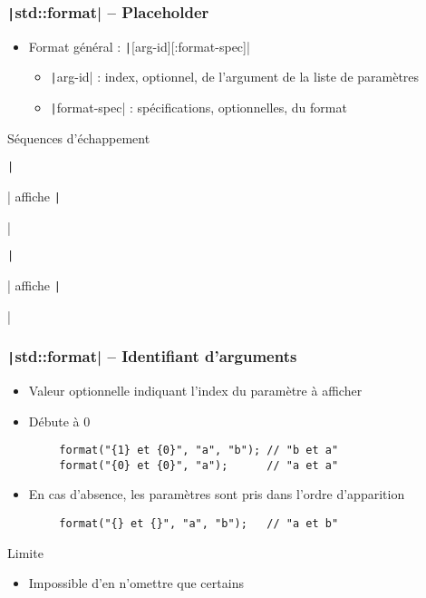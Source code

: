 \documentclass[C++.tex]{subfiles}
\begin{document}
\begin{frame}[fragile]
	\frametitle{\texttt|std::format| -- Placeholder}
	\begin{itemize}
		\item Format général : \texttt|{[arg-id][:format-spec]}|
		\begin{itemize}
			\item \texttt|arg-id| : index, optionnel, de l'argument de la liste de paramètres
			\item \texttt|format-spec| : spécifications, optionnelles, du format
		\end{itemize}
	\end{itemize}

	\begin{block}{Séquences d'échappement}
		\begin{itemize}
			\item \texttt|{{| affiche \texttt|{|
			\item \texttt|}}| affiche \texttt|}|
		\end{itemize}
	\end{block}
\end{frame}

\begin{frame}[fragile]
	\frametitle{\texttt|std::format| -- Identifiant d'arguments}
	\begin{itemize}
		\item Valeur optionnelle indiquant l'index du paramètre à afficher
		\item Débute à 0
	\end{itemize}

	\begin{verbatim}
		format("{1} et {0}", "a", "b"); // "b et a"
		format("{0} et {0}", "a");      // "a et a"
	\end{verbatim}

	\begin{itemize}
		\item En cas d'absence, les paramètres sont pris dans l'ordre d'apparition
	\end{itemize}

	\begin{verbatim}
		format("{} et {}", "a", "b");   // "a et b"
	\end{verbatim}

	\begin{alertblock}{Limite}
		\begin{itemize}
			\item Impossible d'en n'omettre que certains
		\end{itemize}
	\end{alertblock}
\end{frame}
\end{document}
